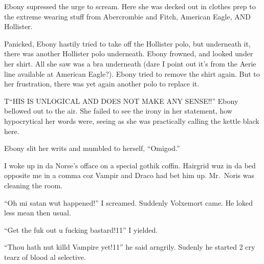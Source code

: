 Ebony supressed the urge to scream. Here she was decked out in clothes prep to the extreme wearing stuff from Abercrombie and Fitch, American Eagle, AND Hollister.

\begin{sloppypar}
    Panicked, Ebony hastily tried to take off the Hollister polo, but underneath it, there was another Hollister polo underneath. Ebony frowned, and looked under her shirt. All she saw was a bra underneath (dare I point out it's from the Aerie line available at American Eagle?). Ebony tried to remove the shirt again. But to her frustration, there was yet again another polo to replace it.
\end{sloppypar}

\begin{sloppypar}
    T\enquote{HIS IS UNLOGICAL AND DOES NOT MAKE ANY SENSE!!} Ebony bellowed out to the air. She failed to see the irony in her statement, how hypocrytical her words were, seeing as she was practically calling the kettle black here.
\end{sloppypar}

Ebony slit her writs and mumbled to herself, \enquote{Omigod.}


\vspace{1em}




I woke up in da Norse's offace on a special gothik coffin. Hairgrid wuz in da bed opposite me in a comma coz Vampir and Draco had bet him up. Mr.~Noris was cleaning the room.

\enquote{Oh mi satan wut happened!} I screamed. Suddenly Volxemort came. He loked less mean then usual.

\enquote{Get the fuk out u fucking bastard!11} I yielded.

\enquote{Thou hath nut killd Vampire yet!11} he said arngrily. Sudenly he started 2 cry tearz of blood al selective.

